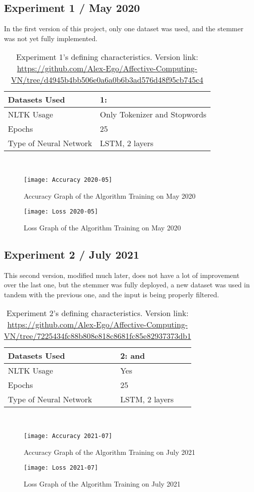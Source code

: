 \subsection{Experiment 1 / May 2020}
In the first version of this project, only one dataset was used, and the stemmer was not yet fully implemented.
\begin{table}[!h]
	\caption{Experiment 1's defining characteristics. Version link: \url{https://github.com/Alex-Ego/Affective-Computing-VN/tree/d4945b4bb506e0a6a0b6b3ad576d48f95cb745c4}}
	\vspace{0.5cm}
	\centering
	\begin{tabular}[t]{|l|l|}
	\hline
		Datasets Used & 1: \citet{d1}
	\\ \hline
		NLTK Usage & Only Tokenizer and Stopwords
	\\ \hline
		Epochs & 25
	\\ \hline
		Type of Neural Network & LSTM, 2 layers
	\\ \hline
	\end{tabular}
\end{table}
\\
\begin{figure}[!h]
	\centering
	\texttt{[image: Accuracy 2020-05]}
	\caption{Accuracy Graph of the Algorithm Training on May 2020}
	\label{fig:accuracy2020}
	\texttt{[image: Loss 2020-05]}
	\caption{Loss Graph of the Algorithm Training on May 2020}
	\label{fig:loss2020}
\end{figure}
\pagebreak
\subsection{Experiment 2 / July 2021}
This second version, modified much later, does not have a lot of improvement over the last one, but the stemmer was fully deployed, a new dataset was used in tandem with the previous one, and the input is being properly filtered.
\begin{table}[!h]
	\caption{Experiment 2's defining characteristics. Version link: \url{https://github.com/Alex-Ego/Affective-Computing-VN/tree/7225434fc88b808e818c8681fc85e82937373db1}}
	\vspace{0.5cm}
	\centering
	\begin{tabular}[t]{|l|l|}
	\hline
		Datasets Used & 2: \citet{d1} and \citet{d2}
	\\ \hline
		NLTK Usage & Yes
	\\ \hline
		Epochs & 25
	\\ \hline
		Type of Neural Network & LSTM, 2 layers
	\\ \hline
	\end{tabular}
\end{table}
\\
\begin{figure}[!h]
	\centering
	\texttt{[image: Accuracy 2021-07]}
	\caption{Accuracy Graph of the Algorithm Training on July 2021}
	\label{fig:accuracy2021-07}
	\texttt{[image: Loss 2021-07]}
	\caption{Loss Graph of the Algorithm Training on July 2021}
	\label{fig:loss2021-07}
\end{figure}
\pagebreak
